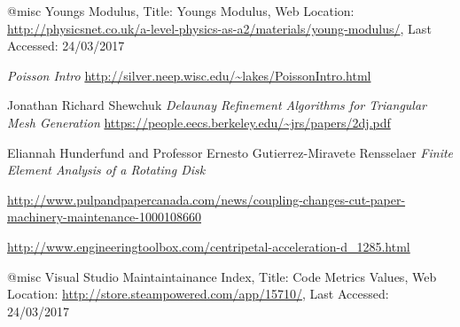 \begin{changemargin}{\CMwidth}{\CMheight}
\begin{thebibliography}{9}
 @misc{ Youngs Modulus,
  {Title: Youngs Modulus},
  {Web Location: \url{http://physicsnet.co.uk/a-level-physics-as-a2/materials/young-modulus/}},
  {Last Accessed: 24/03/2017}}

 \emph{Poisson Intro} \url{http://silver.neep.wisc.edu/~lakes/PoissonIntro.html}

 Jonathan Richard Shewchuk \emph{Delaunay Refinement Algorithms
for Triangular Mesh Generation} \url{https://people.eecs.berkeley.edu/~jrs/papers/2dj.pdf}

 Eliannah Hunderfund and Professor Ernesto Gutierrez-Miravete Rensselaer 
\emph{Finite Element Analysis of a Rotating Disk}


 \url{http://www.pulpandpapercanada.com/news/coupling-changes-cut-paper-machinery-maintenance-1000108660}

 \url{http://www.engineeringtoolbox.com/centripetal-acceleration-d_1285.html}


 @misc{ Visual Studio Maintaintainance Index,
  {Title: Code Metrics Values},
  {Web Location: \url{http://store.steampowered.com/app/15710/}},
  {Last Accessed: 24/03/2017}}
	


\end{thebibliography}
\end{changemargin}
